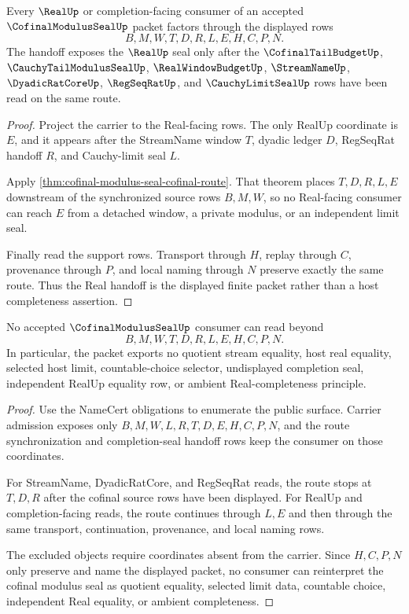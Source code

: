 \begin{theorem}
\label{thm:cofinal-modulus-seal-real-handoff}
Every $\RealUp$ or completion-facing consumer of an accepted $\CofinalModulusSealUp$ packet factors through the displayed rows
$$
B,M,W,T,D,R,L,E,H,C,P,N.
$$
The handoff exposes the $\RealUp$ seal only after the $\CofinalTailBudgetUp$, $\CauchyTailModulusSealUp$, $\RealWindowBudgetUp$, $\StreamNameUp$, $\DyadicRatCoreUp$, $\RegSeqRatUp$, and $\CauchyLimitSealUp$ rows have been read on the same route.
\end{theorem}
\begin{proof}
Project the carrier to the Real-facing rows. The only RealUp coordinate is $E$, and it appears after the StreamName window $T$, dyadic ledger $D$, RegSeqRat handoff $R$, and Cauchy-limit seal $L$.

Apply \autoref{thm:cofinal-modulus-seal-cofinal-route}. That theorem places $T,D,R,L,E$ downstream of the synchronized source rows $B,M,W$, so no Real-facing consumer can reach $E$ from a detached window, a private modulus, or an independent limit seal.

Finally read the support rows. Transport through $H$, replay through $C$, provenance through $P$, and local naming through $N$ preserve exactly the same route. Thus the Real handoff is the displayed finite packet rather than a host completeness assertion.
\end{proof}

\begin{theorem}
\label{thm:cofinal-modulus-seal-nonescape}
No accepted $\CofinalModulusSealUp$ consumer can read beyond
$$
B,M,W,T,D,R,L,E,H,C,P,N.
$$
In particular, the packet exports no quotient stream equality, host real equality, selected host limit, countable-choice selector, undisplayed completion seal, independent RealUp equality row, or ambient Real-completeness principle.
\end{theorem}
\begin{proof}
Use the NameCert obligations to enumerate the public surface. Carrier admission exposes only $B,M,W,L,R,T,D,E,H,C,P,N$, and the route synchronization and completion-seal handoff rows keep the consumer on those coordinates.

For StreamName, DyadicRatCore, and RegSeqRat reads, the route stops at $T,D,R$ after the cofinal source rows have been displayed. For RealUp and completion-facing reads, the route continues through $L,E$ and then through the same transport, continuation, provenance, and local naming rows.

The excluded objects require coordinates absent from the carrier. Since $H,C,P,N$ only preserve and name the displayed packet, no consumer can reinterpret the cofinal modulus seal as quotient equality, selected limit data, countable choice, independent Real equality, or ambient completeness.
\end{proof}

